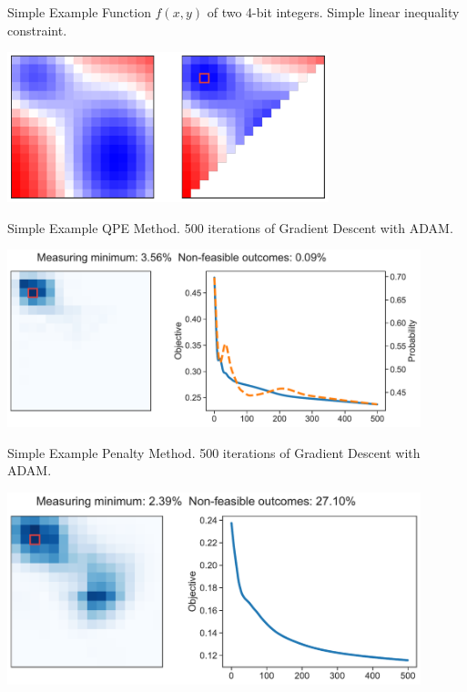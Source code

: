 \documentclass[aspectratio=169]{beamer}
\begin{document}
\begin{frame}{Simple Example}
    Function $f(x, y)$ of two 4-bit integers. Simple linear inequality
    constraint.
    \begin{center}
        \includegraphics[width=0.7\textwidth]{../plots/example1.pdf}
    \end{center}
\end{frame}

\begin{frame}{Simple Example}
    QPE Method. 500 iterations of Gradient Descent with ADAM.
    \begin{center}
        \includegraphics[width=0.9\textwidth]{../plots/opt_example1_masked.pdf}
    \end{center}
\end{frame}

\begin{frame}{Simple Example}
    Penalty Method. 500 iterations of Gradient Descent with ADAM.
    \begin{center}
        \includegraphics[width=0.9\textwidth]{../plots/opt_example1_penalty.pdf}
    \end{center}
\end{frame}
\end{document}
